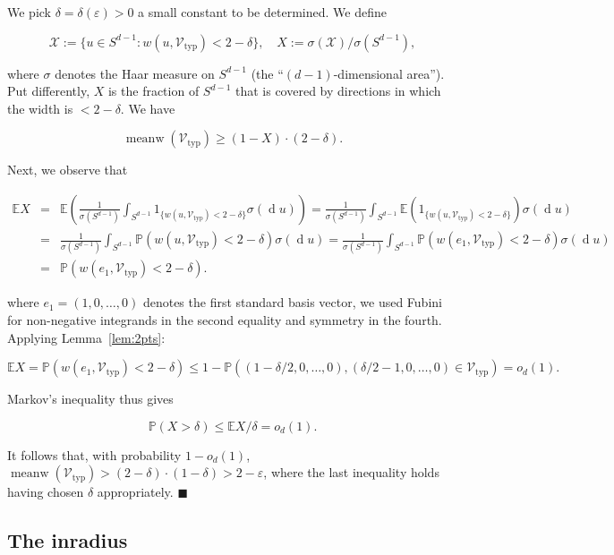 \documentclass[11pt]{article}%
\newenvironment{proof}{\vspace{1ex}\noindent{\bf Proof.}}{\hspace*{\fill}$\blacksquare$\vspace{1ex}}
\newcommand{\Vcal}[0]{\ensuremath{{\mathcal V}}}
\newcommand{\Xcal}[0]{\ensuremath{{\mathcal X}}}
\newcommand{\Pee}[0]{\ensuremath{{\mathbb P}}}
\newcommand{\Ee}[0]{\ensuremath{{\mathbb E}}}
\newcommand{\eps}{\varepsilon}
\DeclareMathOperator{\dd}{d}
\DeclareMathOperator{\meanw}{meanw}
\newcommand{\Vtyp}[0]{\Vcal_{\text{typ}}}
\begin{document}
\begin{proof}
We pick $\delta=\delta(\eps)>0$ a small constant to be determined.
We define

$$ \Xcal := \{ u \in S^{d-1} : w(u,\Vtyp) < 2-\delta \}, \quad X := \sigma(\Xcal)/\sigma(S^{d-1}), $$

\noindent
where $\sigma$ denotes the Haar measure on $S^{d-1}$ (the ``$(d-1)$-dimensional area'').
Put differently, $X$ is the fraction of $S^{d-1}$ that is covered by directions in 
which the width is $<2-\delta$.
We have 

$$ \meanw(\Vtyp) \geq (1-X) \cdot (2-\delta). $$

\noindent
Next, we observe that 

$$ \begin{array}{rcl} \Ee X 
& = & \displaystyle \Ee\left( \frac{1}{\sigma(S^{d-1})} \int_{S^{d-1}} 1_{\{w(u,\Vtyp)<2-\delta\}}\sigma({\dd}u) \right) 
= \frac{1}{\sigma(S^{d-1})} \int_{S^{d-1}} \Ee\left( 1_{\{w(u,\Vtyp)<2-\delta\}} \right) \sigma({\dd}u) \\[2ex]
& = & \displaystyle \frac{1}{\sigma(S^{d-1})} \int_{S^{d-1}} \Pee( w(u,\Vtyp)<2-\delta ) \sigma({\dd}u) 
= \displaystyle \frac{1}{\sigma(S^{d-1})} \int_{S^{d-1}} \Pee( w(e_1,\Vtyp)<2-\delta ) \sigma({\dd}u) \\[2ex]
& = & \displaystyle \Pee( w(e_1,\Vtyp)<2-\delta ).
\end{array} $$

\noindent
where $e_1 = (1,0,\dots,0)$ denotes the first standard basis vector, 
we used Fubini for non-negative integrands in the second equality and symmetry in the fourth.
Applying Lemma~\ref{lem:2pts}:

$$ 
\Ee X = \Pee( w(e_1,\Vtyp) < 2-\delta )  \leq   
1-\Pee( (1-\delta/2,0,\dots,0), (\delta/2-1,0,\dots,0) \in \Vtyp ) = o_d(1). 
$$

\noindent
Markov's inequality thus gives

$$ \Pee( X > \delta ) \leq \Ee X / \delta = o_d(1). $$

\noindent
It follows that, with probability $1-o_d(1)$, $\meanw(\Vtyp) > (2-\delta)\cdot(1-\delta) > 2-\eps$, where 
the last inequality holds having chosen $\delta$ appropriately.
\end{proof}



\subsection{The inradius}
\end{document}
